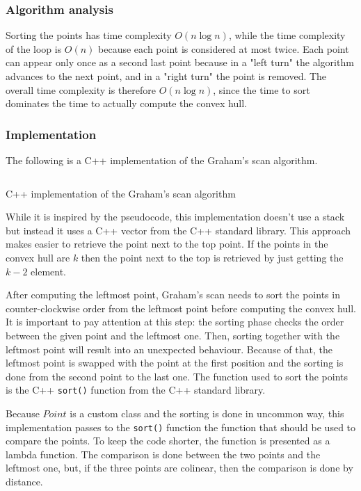 \documentclass{article}
\begin{document}
\subsubsection*{Algorithm analysis}
Sorting the points has time complexity $O(n\log{n})$, while the time complexity of the loop is $O(n)$ because each point is considered at most twice. Each point can appear only once as a second last point because in a "left turn" the algorithm advances to the next point, and in a "right turn" the point is removed. The overall time complexity is therefore $O(n\log{n})$, since the time to sort dominates the time to actually compute the convex hull.

\subsubsection*{Implementation}
The following is a C++ implementation of the Graham's scan algorithm.
\begin{listing}[H]
    \inputminted{cpp}{code/grahamscan.cpp}
    \caption{C++ implementation of the Graham's scan algorithm}
\end{listing}

While it is inspired by the pseudocode, this implementation doesn't use a stack but instead it uses a C++ vector from the C++ standard library. This approach makes easier to retrieve the point next to the top point. If the points in the convex hull are $k$ then the point next to the top is retrieved by just getting the $k-2$ element. 

After computing the leftmost point, Graham's scan needs to sort the points in counter-clockwise order from the leftmost point before computing the convex hull. It is important to pay attention at this step: the sorting phase checks the order between the given point and the leftmost one. Then, sorting together with the leftmost point will result into an unexpected behaviour. Because of that, the leftmost point is swapped with the point at the first position and the sorting is done from the second point to the last one. The function used to sort the points is the C++ \texttt{sort()} function from the C++ standard library. 

Because $Point$ is a custom class and the sorting is done in uncommon way, this implementation passes to the \texttt{sort()} function the function that should be used to compare the points. To keep the code shorter, the function is presented as a lambda function. The comparison is done between the two points and the leftmost one, but, if the three points are colinear, then the comparison is done by distance.
\end{document}
